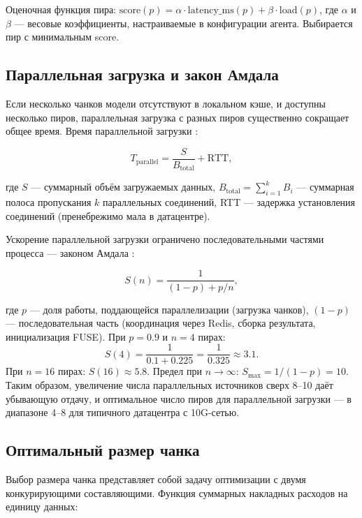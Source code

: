 Оценочная функция пира: $\mathrm{score}(p) = \alpha \cdot \mathrm{latency\_ms}(p) + \beta \cdot \mathrm{load}(p)$, где $\alpha$ и $\beta$ --- весовые коэффициенты, настраиваемые в конфигурации агента. Выбирается пир с минимальным score.

\subsection*{Параллельная загрузка и закон Амдала}

Если несколько чанков модели отсутствуют в локальном кэше, и доступны несколько пиров, параллельная загрузка с разных пиров существенно сокращает общее время. Время параллельной загрузки \cite{zipf_law}:

\begin{equation}
T_{\mathrm{parallel}} = \frac{S}{B_{\mathrm{total}}} + \mathrm{RTT},
\label{eq:p2p_time}
\end{equation}

где $S$ --- суммарный объём загружаемых данных, $B_{\mathrm{total}} = \sum_{i=1}^{k} B_i$ --- суммарная полоса пропускания $k$ параллельных соединений, RTT --- задержка установления соединений (пренебрежимо мала в датацентре).

Ускорение параллельной загрузки ограничено последовательными частями процесса --- законом Амдала \cite{amdahl_law}:

\begin{equation}
S(n) = \frac{1}{(1-p) + p/n},
\label{eq:amdahl}
\end{equation}

где $p$ --- доля работы, поддающейся параллелизации (загрузка чанков), $(1-p)$ --- последовательная часть (координация через Redis, сборка результата, инициализация FUSE). При $p = 0.9$ и $n = 4$ пирах:
\[
S(4) = \frac{1}{0.1 + 0.225} = \frac{1}{0.325} \approx 3.1.
\]
При $n = 16$ пирах: $S(16) \approx 5.8$. Предел при $n \to \infty$: $S_{\max} = 1/(1-p) = 10$. Таким образом, увеличение числа параллельных источников сверх 8--10 даёт убывающую отдачу, и оптимальное число пиров для параллельной загрузки --- в диапазоне 4--8 для типичного датацентра с 10G-сетью.

\subsection*{Оптимальный размер чанка}

Выбор размера чанка представляет собой задачу оптимизации с двумя конкурирующими составляющими. Функция суммарных накладных расходов на единицу данных:

